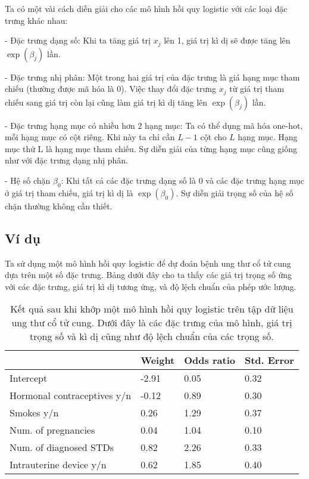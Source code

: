 Ta có một vài cách diễn giải cho các mô hình hồi quy logistic với các loại đặc trưng khác nhau:

- Đặc trưng dạng số: Khi ta tăng giá trị $x_j$ lên 1, giá trị kì dị sẽ được tăng lên $\exp(\beta_{j})$ lần.

- Đặc trưng nhị phân: Một trong hai giá trị của đặc trưng là giá hạng mục tham chiếu (thường được mã hóa là 0). Việc thay đổi đặc trưng $x_j$ từ giá trị tham chiếu sang giá trị còn lại cũng làm giá trị kì dị tăng lên  $\exp(\beta_{j})$ lần.

- Đặc trưng hạng mục có nhiều hơn 2 hạng mục: Ta có thể dụng mã hóa one-hot, mỗi hạng mục có cột riêng. Khi này ta chỉ cần $L-1$ cột cho $L$ hạng mục. Hạng mục thứ L là hạng mục tham chiếu. Sự diễn giải của từng hạng mục cũng giống như với đặc trưng dạng nhị phân.

- Hệ số chặn $\beta_{0}$: Khi tất cả các đặc trưng dạng số là 0 và các đặc trưng hạng mục ở giá trị tham chiếu, giá trị kì dị là $\exp(\beta_{0})$. Sự diễn giải trọng số của hệ số chặn thường không cần thiết.

\subsection{Ví dụ}

Ta sử dụng một mô hình hồi quy logistic để dự đoán bệnh ung thư cổ tử cung dựa trên một số đặc trưng. Bảng dưới đây cho ta thấy các giá trị trọng số ứng với các đặc trưng, giá trị kì dị tương ứng, và độ lệch chuẩn của phép ước lượng.

\begin{table*}[!ht]
\centering
\caption{Kết quả sau khi khớp một mô hình hồi quy logistic trên tập dữ liệu ung thư cổ tử cung. Dưới đây là các đặc trưng của mô hình, giá trị trọng số và kì dị cũng như độ lệch chuẩn của các trọng số.}
\label{tab:4_2_4}
\begin{tabular}{|l|l|l|l|}
\hline
                            & \textbf{Weight} & \textbf{Odds ratio} & \textbf{Std. Error} \\ \hline
Intercept                   & -2.91           & 0.05                & 0.32                \\ \hline
Hormonal contraceptives y/n & -0.12           & 0.89                & 0.30                \\ \hline
Smokes y/n                  & 0.26            & 1.29                & 0.37                \\ \hline
Num. of pregnancies         & 0.04            & 1.04                & 0.10                \\ \hline
Num. of diagnosed STDs      & 0.82            & 2.26                & 0.33                \\ \hline
Intrauterine device y/n     & 0.62            & 1.85                & 0.40                \\ \hline
\end{tabular}
\end{table*}

